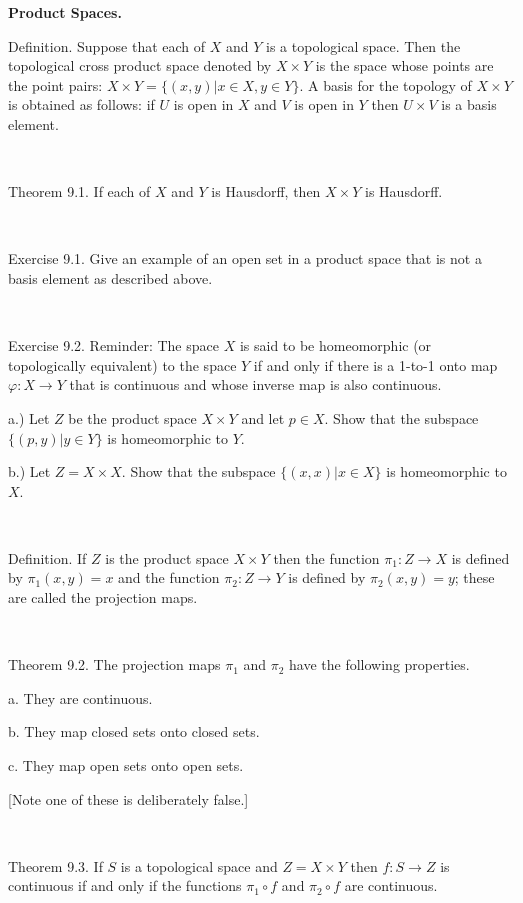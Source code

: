 \documentclass[12pt, std]{article}
\begin{document}
\begin{center} \textbf{Product Spaces.} \end{center}

Definition.  Suppose that each of $X$ and $Y$ is a topological
space.  Then the topological cross product space denoted by $X
\times Y$ is the space whose points are the point pairs: $X \times Y
= \{ (x,y) | x \in X, y \in Y \}$.  A basis for the topology of $X
\times Y$ is obtained as follows: if $U$ is open in $X$ and $V$ is
open in $Y$ then $U \times V$ is a basis element.

\

Theorem 9.1.  If each of $X$ and $Y$ is Hausdorff, then $X \times
Y$ is Hausdorff.

\

Exercise 9.1.  Give an example of an open set in a product space that is
not a basis element as described above.

\

Exercise 9.2.  Reminder: The space $X$ is said to be homeomorphic (or topologically equivalent) to the space $Y$ if and only if there is a 1-to-1 onto map $\varphi: X \to Y$ that is continuous and whose inverse map is also continuous.
 
a.) Let $Z$ be the product space $X \times Y$ and let $p \in
X$.  Show that the subspace $\{(p, y) | y \in Y \}$ is homeomorphic to
$Y$.

b.) Let $Z = X \times X$.  Show that the subspace $\{ (x,x)| x \in
X \}$ is homeomorphic to $X$.

\

Definition.  If $Z$ is the product space $X \times Y$ then the
function $\pi_1 : Z \rightarrow X$ is defined by $\pi_1(x,y) = x$
and the function $\pi_2 : Z \rightarrow Y$ is defined by $\pi_2(x,y)
= y$; these are called the projection maps.

\

Theorem 9.2.  The projection maps $\pi_1$ and $\pi_2$ have the
following properties.

\qquad a.  They are continuous.

\qquad b.  They map closed sets onto closed sets.

\qquad c.  They map open sets onto open sets.

[Note one of these is deliberately false.]

\

Theorem 9.3.  If $S$ is a topological space and $Z = X \times Y$
then $f: S \rightarrow Z$ is continuous if and only if the functions
$ \pi_1 \circ f$ and $\pi_2 \circ f$ are continuous.
\end{document}
